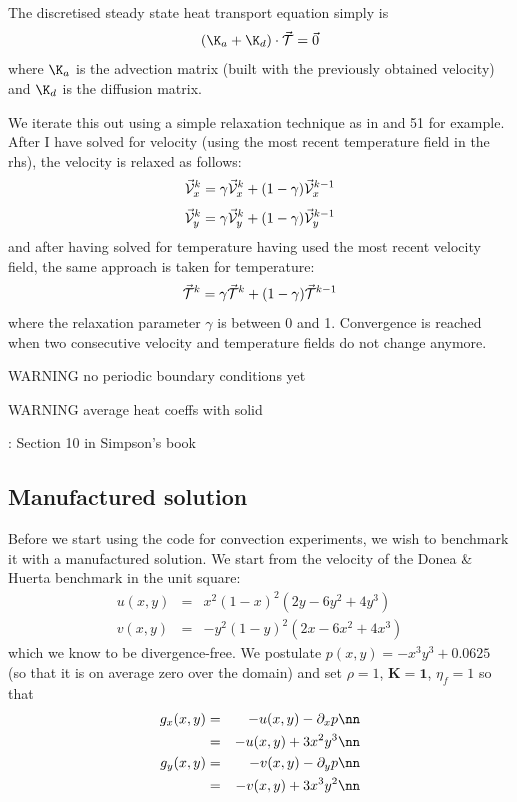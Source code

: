 The discretised steady state heat transport equation simply is 
\[
({\K}_a + {\K}_d ) \cdot \vec{\cal T}= \vec{0}
\]
where $\K_a$ is the advection matrix (built with the previously obtained velocity) 
and $\K_d$ is the diffusion matrix.

We iterate this out using a simple relaxation technique \cite{vyrc13} as in  and 51 for example.
After I have solved for velocity (using the most recent temperature field in the rhs), 
the velocity is relaxed as follows:
\[
\vec{\cal V}_x^k = \gamma \vec{\cal V}_x^k + (1-\gamma) \vec{\cal V}_x^{k-1}
\]
\[
\vec{\cal V}_y^k = \gamma \vec{\cal V}_y^k + (1-\gamma) \vec{\cal V}_y^{k-1}
\]
and after having solved for temperature having used the most recent velocity field, the same approach is taken for temperature:
\[
\vec{\cal T}^k = \gamma \vec{\cal T}^k + (1-\gamma) \vec{\cal T}^{k-1}
\]
where the relaxation parameter $\gamma$ is between 0 and 1.
Convergence is reached when two consecutive velocity and temperature fields
do not change anymore.

\vspace{1cm}

WARNING no periodic boundary conditions yet

WARNING average heat coeffs with solid

\Literature: Section 10 in Simpson's book \cite{simp17}

\subsection*{Manufactured solution}

Before we start using the code for convection experiments, we wish to benchmark it
with a manufactured solution. 
We start from the velocity of the Donea \& Huerta benchmark in the unit square:
\begin{eqnarray}
u(x,y) &=& x^2(1- x)^2 (2y - 6y^2 + 4y^3)  \\
v(x,y) &=& -y^2 (1 - y)^2 (2x - 6x^2 + 4x^3) 
\end{eqnarray}
which we know to be divergence-free.
We postulate $p(x,y)=-x^3y^3+0.0625$ (so that it is on average zero over the domain) 
and set $\rho=1$, ${\bm K}={\bm 1}$, $\eta_f=1$ so that 
\begin{eqnarray} 
g_x(x,y) 
&=& -u(x,y) - \partial_x p \nn\\
&=& -u(x,y) +3x^2y^3 \nn\\ 
g_y(x,y)  
&=& -v(x,y) - \partial_y p \nn\\ 
&=& -v(x,y) +3x^3y^2 \nn
\end{eqnarray}

